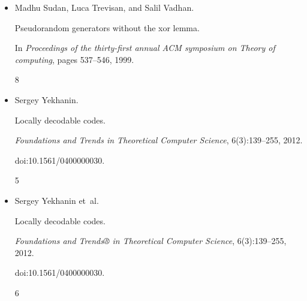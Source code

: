 \documentclass[10pt,a4paper]{article}
\begin{document}
\begin{itemize}
Daniel A. Spielman.


Linear-time encodable and decodable error-correcting codes.


\emph{IEEE Trans. Inf. Theory}, 42(6):1723–1731, 1996.


doi:10.1109/18.556668.


5, 6




\item[] 
[31]

Madhu Sudan, Luca Trevisan, and Salil Vadhan.


Pseudorandom generators without the xor lemma.


In \emph{Proceedings of the thirty-first annual ACM symposium on
Theory of computing}, pages 537–546, 1999.


8




\item[] 
[32]

Sergey Yekhanin.


Locally decodable codes.


\emph{Foundations and Trends in Theoretical Computer Science},
6(3):139–255, 2012.


doi:10.1561/0400000030.


5




\item[] 
[33]

Sergey Yekhanin et al.


Locally decodable codes.


\emph{Foundations and Trends® in Theoretical Computer
Science}, 6(3):139–255, 2012.


doi:10.1561/0400000030.


6




\end{itemize}
\end{document}
